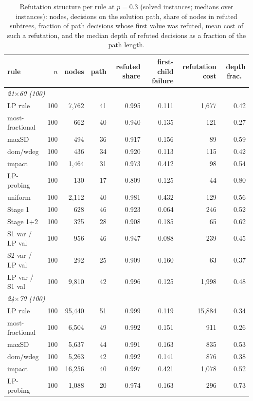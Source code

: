 \begin{table}[t]
\centering
\caption{Refutation structure per rule at $p=0.3$ (solved instances; medians over instances): nodes, decisions on the solution path, share of nodes in refuted subtrees, fraction of path decisions whose first value was refuted, mean cost of such a refutation, and the median depth of refuted decisions as a fraction of the path length.}
\label{tab:trace}
\scriptsize
\begin{tabular}{lrrrrrrr}
\toprule
rule & $n$ & nodes & path & refuted share & first-child failure & refutation cost & depth frac.\ \\
\midrule
\multicolumn{8}{l}{\emph{21$\times$60 (100)}} \\
LP rule & 100 & 7,762 & 41 & 0.995 & 0.111 & 1,677 & 0.42 \\
most-fractional & 100 & 662 & 40 & 0.940 & 0.135 & 121 & 0.27 \\
maxSD & 100 & 494 & 36 & 0.917 & 0.156 & 89 & 0.59 \\
dom/wdeg & 100 & 436 & 34 & 0.920 & 0.113 & 115 & 0.42 \\
impact & 100 & 1,464 & 31 & 0.973 & 0.412 & 98 & 0.54 \\
LP-probing & 100 & 130 & 17 & 0.809 & 0.125 & 44 & 0.80 \\
uniform & 100 & 2,112 & 40 & 0.981 & 0.432 & 129 & 0.56 \\
Stage 1 & 100 & 628 & 46 & 0.923 & 0.064 & 246 & 0.52 \\
Stage 1+2 & 100 & 325 & 28 & 0.908 & 0.185 & 65 & 0.62 \\
S1 var / LP val & 100 & 956 & 46 & 0.947 & 0.088 & 239 & 0.45 \\
S2 var / LP val & 100 & 292 & 25 & 0.909 & 0.160 & 63 & 0.37 \\
LP var / S1 val & 100 & 9,810 & 42 & 0.996 & 0.125 & 1,998 & 0.48 \\
\midrule
\multicolumn{8}{l}{\emph{24$\times$70 (100)}} \\
LP rule & 100 & 95,440 & 51 & 0.999 & 0.119 & 15,884 & 0.34 \\
most-fractional & 100 & 6,504 & 49 & 0.992 & 0.151 & 911 & 0.26 \\
maxSD & 100 & 5,637 & 44 & 0.991 & 0.163 & 835 & 0.53 \\
dom/wdeg & 100 & 5,263 & 42 & 0.992 & 0.141 & 876 & 0.38 \\
impact & 100 & 16,256 & 40 & 0.997 & 0.421 & 1,078 & 0.52 \\
LP-probing & 100 & 1,088 & 20 & 0.974 & 0.163 & 296 & 0.73 \\

\end{tabular}
\end{table}
